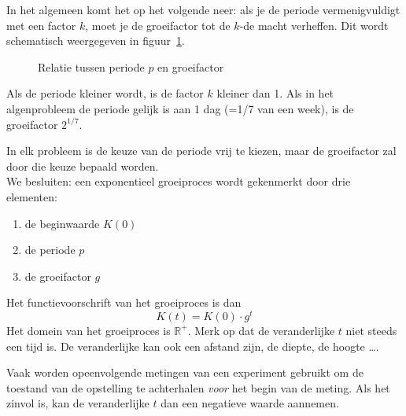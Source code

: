 In het algemeen komt het op het volgende neer: als je de periode vermenigvuldigt met een factor $k$, moet je de groeifactor tot de $k$-de macht verheffen. Dit wordt schematisch weergegeven in figuur~\ref{fig:periode_factor}.
\begin{figure}[tbp]
    \centering
{}
    \caption{Relatie tussen periode $p$ en groeifactor}
    \label{fig:periode_factor}
\end{figure}
Als de periode kleiner wordt, is de factor $k$ kleiner dan 1. Als in het algenprobleem de periode gelijk is aan 1 dag (=1/7 van een week), is de groeifactor $2^{1/7}$.

In elk probleem is de
keuze van de periode vrij te kiezen, maar de groeifactor zal door die
keuze bepaald worden.\\


We besluiten: een exponentieel groeiproces wordt gekenmerkt door drie elementen:
\begin{enumerate}
\item de beginwaarde $K(0)$
\item de periode $p$
\item de groeifactor $g$
\end{enumerate}
Het functievoorschrift van het groeiproces is dan 
\begin{equation}
K(t)=K(0)\cdot g^t
\label{eq:exp_groei}
\end{equation}
Het domein van het groeiproces is $\mathbb{R}^+$.
Merk op dat de veranderlijke $t$ niet steeds een tijd is. De veranderlijke kan ook een afstand zijn, de diepte, de hoogte \dots.

Vaak worden opeenvolgende metingen van een experiment gebruikt om de toestand van de opstelling te achterhalen  \emph{voor} het begin van de meting. Als het zinvol is, kan de veranderlijke $t$ dan een negatieve waarde aannemen. 

